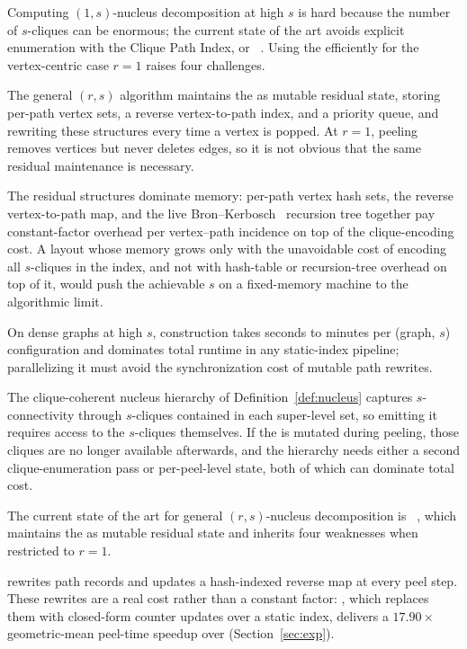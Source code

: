 Computing $(1,s)$-nucleus decomposition at high $s$ is hard because the number of $s$-cliques can be enormous; the current state of the art avoids explicit enumeration with the Clique Path Index, or \cpi{}~\cite{NuclearCD}.
%
Using the \cpi{} efficiently for the vertex-centric case $r=1$ raises four challenges.

The general $(r,s)$ algorithm maintains the \cpi{} as mutable residual state, storing per-path vertex sets, a reverse vertex-to-path index, and a priority queue, and rewriting these structures every time a vertex is popped.
%
At $r{=}1$, peeling removes vertices but never deletes edges, so it is not obvious that the same residual maintenance is necessary.

The residual structures dominate memory: per-path vertex hash sets, the reverse vertex-to-path map, and the live Bron--Kerbosch~\cite{BronKerbosch} recursion tree together pay constant-factor overhead per vertex--path incidence on top of the clique-encoding cost.
%
A layout whose memory grows only with the unavoidable cost of encoding all $s$-cliques in the index, and not with hash-table or recursion-tree overhead on top of it, would push the achievable $s$ on a fixed-memory machine to the algorithmic limit.

On dense graphs at high $s$, \cpi{} construction takes seconds to minutes per (graph, $s$) configuration and dominates total runtime in any static-index pipeline; parallelizing it must avoid the synchronization cost of mutable path rewrites.

The clique-coherent nucleus hierarchy of Definition~\ref{def:nucleus} captures $s$-connectivity through $s$-cliques contained in each super-level set, so emitting it requires access to the $s$-cliques themselves.
%
If the \cpi{} is mutated during peeling, those cliques are no longer available afterwards, and the hierarchy needs either a second clique-enumeration pass or per-peel-level state, both of which can dominate total cost.

The current state of the art for general $(r,s)$-nucleus decomposition is \cbnd~\cite{NuclearCD}, which maintains the \cpi{} as mutable residual state and inherits four weaknesses when restricted to $r=1$.

\cbnd{} rewrites path records and updates a hash-indexed reverse map at every peel step.
%
These rewrites are a real cost rather than a constant factor: \spinStar{}, which replaces them with closed-form counter updates over a static index, delivers a $17.90\times$ geometric-mean peel-time speedup over \cbnd{} (Section~\ref{sec:exp}).

